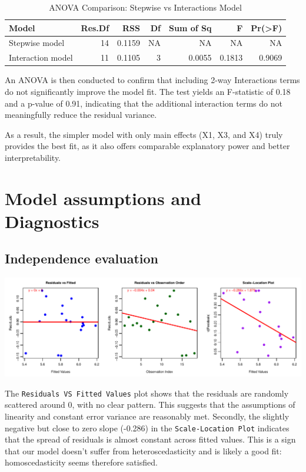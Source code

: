 \documentclass[
  11pt,
]{article}
\begin{document}
\begin{table}[!h]
\centering
\caption{\label{tab:unnamed-chunk-12}ANOVA Comparison: Stepwise vs Interactions Model}
\centering
\fontsize{8}{10}\selectfont
\begin{tabular}[t]{lrrrrrr}
\toprule
Model & Res.Df & RSS & Df & Sum of Sq & F & Pr(>F)\\
\midrule
Stepwise model & 14 & 0.1159 & NA & NA & NA & NA\\
Interaction model & 11 & 0.1105 & 3 & 0.0055 & 0.1813 & 0.9069\\
\bottomrule
\end{tabular}
\end{table}

An ANOVA is then conducted to confirm that including 2-way Interactions
terms do not significantly improve the model fit. The test yields an
F-statistic of 0.18 and a p-value of 0.91, indicating that the
additional interaction terms do not meaningfully reduce the residual
variance.

As a result, the simpler model with only main effects (X1, X3, and X4)
truly provides the best fit, as it also offers comparable explanatory
power and better interpretability.

\section{Model assumptions and
Diagnostics}\label{model-assumptions-and-diagnostics}

\subsection{Independence evaluation}\label{independence-evaluation}

\includegraphics{Figs/unnamed-chunk-13-1.pdf}

The \texttt{Residuals\ VS\ Fitted\ Values} plot shows that the residuals
are randomly scattered around 0, with no clear pattern. This suggests
that the assumptions of linearity and constant error variance are
reasonably met. Secondly, the slightly negative but close to zero slope
(-0.286) in the \texttt{Scale-Location\ Plot} indicates that the spread
of residuals is almost constant across fitted values. This is a sign
that our model doesn't suffer from heteroscedasticity and is likely a
good fit: homoscedasticity seems therefore satisfied.
\end{document}
